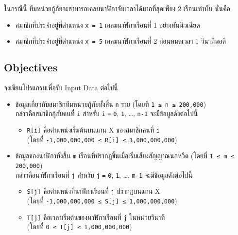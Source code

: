 ในกรณีนี้ ทีมหน่วยกู้ภัยจะสามารถเคลมนาฬิกาจับเวลาได้มากที่สุดเพียง 2 เรือนเท่านั้น นั่นคือ
\begin{itemize}[leftmargin=4pc]
    \item  สมาชิกที่ประจำอยู่ที่ตำแหน่ง \lstinline{x = 1} เคลมนาฬิกาเรือนที่ 1 อย่างทันฉิวเฉียด
    \item  สมาชิกที่ประจำอยู่ที่ตำแหน่ง \lstinline{x = 5} เคลมนาฬิกาเรือนที่ 2 ก่อนหมดเวลา 1 วินาทีพอดี
\end{itemize}


\subsection{Objectives}

\noindent
จงเขียนโปรแกรมเพื่อรับ Input Data ต่อไปนี้

\begin{itemize}
    \item
        ข้อมูลเกี่ยวกับสมาชิกทีมหน่วยกู้ภัยทั้งสิ้น \lstinline{n} ราย\: (โดยที่ \lstinline{1 ≤ n ≤ 200,000}) \\
        กล่าวคือสมาชิกกู้ภัยคนที่ \lstinline{i} สำหรับ \lstinline{i} \lstinline{=} \lstinline{0}, \lstinline{1}, \ldots, \lstinline{n-1} จะมีข้อมูลดังต่อไปนี้
        \begin{itemize}
            \item \lstinline{R[i]} คือตำแหน่งเริ่มต้นบนแกน X ของสมาชิกคนที่ \lstinline{i} \\
            (โดยที่ \lstinline{-1,000,000,000 ≤ R[i] ≤ 1,000,000,000})
        \end{itemize}
    \item
        ข้อมูลของนาฬิกาทั้งสิ้น \lstinline{m} เรือนที่ปรากฏขึ้นเมื่อเริ่มเสียงสัญญาณนกหวีด\: (โดยที่ \lstinline{1 ≤ m ≤ 200,000}) \\
        กล่าวคือนาฬิกาเรือนที่ \lstinline{j} สำหรับ \lstinline{j} \lstinline{=} \lstinline{0}, \lstinline{1}, \ldots, \lstinline{m-1} จะมีข้อมูลดังต่อไปนี้
        \begin{itemize}
            \item  \lstinline{S[j]} คือตำแหน่งที่นาฬิกาเรือนที่ \lstinline{j} ปรากฏบนแกน X \\
            (โดยที่ \lstinline{-1,000,000,000 ≤ S[j] ≤ 1,000,000,000})
            \item \lstinline{T[j]} คือเวลาเริ่มต้นของนาฬิกาเรือนที่ \lstinline{j} ในหน่วยวินาที \\
            (โดยที่ \lstinline{0 ≤ T[j] ≤ 1,000,000,000})
        \end{itemize}
\end{itemize}

